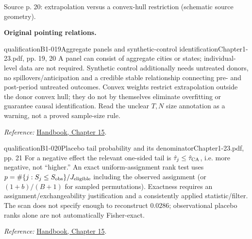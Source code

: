 {\begin{center}
\begin{tikzpicture}[>=Stealth, font=\small, line width=.65pt]
\end{tikzpicture}
\par{\small Source p. 20: extrapolation versus a convex-hull restriction (schematic source geometry).}
\end{center}
\par{}\smallskip\textbf{Original pointing relations.}\par\smallskip
{}
\begin{reviewnote}{qualification}{B1-019}{Aggregate panels and synthetic-control identification}{Chapter1-23.pdf, pp. 19, 20}
A panel can consist of aggregate cities or states; individual-level data are not required. Synthetic control additionally needs untreated donors, no spillovers/anticipation and a credible stable relationship connecting pre- and post-period untreated outcomes. Convex weights restrict extrapolation outside the donor convex hull; they do not by themselves eliminate overfitting or guarantee causal identification. Read the unclear $T,N$ size annotation as a warning, not a proved sample-size rule.
\par\smallskip\textit{Reference:} \href{https://matheusfacure.github.io/python-causality-handbook/15-Synthetic-Control.html}{Handbook, Chapter 15}.
\end{reviewnote}

\begin{reviewnote}{qualification}{B1-020}{Placebo tail probability and its denominator}{Chapter1-23.pdf, pp. 21}
For a negative effect the relevant one-sided tail is $\hat\tau_j\le\hat\tau_{\rm CA}$, i.e. more negative, not ``higher.'' An exact uniform-assignment rank test uses $p=\#\{j:S_j\le S_{\rm obs}\}/J_{\rm eligible}$ including the observed assignment (or $(1+b)/(B+1)$ for sampled permutations). Exactness requires an assignment/exchangeability justification and a consistently applied statistic/filter. The scan does not specify enough to reconstruct $0.0286$; observational placebo ranks alone are not automatically Fisher-exact.
\par\smallskip\textit{Reference:} \href{https://matheusfacure.github.io/python-causality-handbook/15-Synthetic-Control.html}{Handbook, Chapter 15}.
\end{reviewnote}
}
